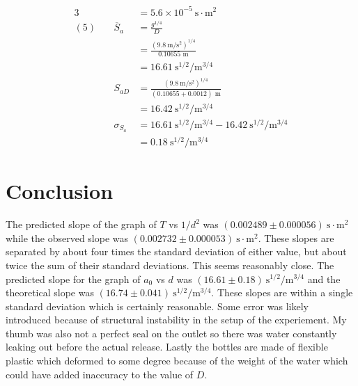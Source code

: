 \documentclass[12pt]{article}
\begin{document}
\begin{alignat*}{3}
            &&&=5.6\times 10^{-5} \mathrm{~s \cdot m^2}\\
            (5)~&&
            \overline{S}_a &= \frac{g^{1/4}}{D}\\
            &&& = \frac{(9.8\mathrm{~m/s^2})^{1/4}}{0.10655\text{ m}}\\
            &&&= 16.61 \mathrm{~s^{1/2}/m^{3/4}}\\
            &&S_{aD} &= \frac{(9.8\mathrm{~m/s^2})^{1/4}}{(0.10655 + 0.0012)\text{ m}}\\
            &&&= 16.42 \mathrm{~s^{1/2}/m^{3/4}}\\
            &&\sigma_{S_a} &= 16.61 \mathrm{~s^{1/2}/m^{3/4}} - 16.42 \mathrm{~s^{1/2}/m^{3/4}}\\
            &&&=0.18\mathrm{~s^{1/2}/m^{3/4}}
        \end{alignat*}
    \section{Conclusion}
    The predicted slope of the graph of \(T\) vs \(1/d^2\) was \((0.002489 \pm 0.000056) \mathrm{~s \cdot m^2}\) while the observed slope was \((0.002732 \pm 0.000053) \mathrm{~s \cdot m^2}\). These slopes are separated by about four times the standard deviation of either value, but about twice the sum of their standard deviations. This seems reasonably close. The predicted slope for the graph of \(a_0\) vs \(d\) was \((16.61 \pm 0.18) \mathrm{~s^{1/2}/m^{3/4}}\) and the theoretical slope was \((16.74 \pm 0.041)\mathrm{~s^{1/2}/m^{3/4}}\). These slopes are within a single standard deviation which is certainly reasonable. Some error was likely introduced because of structural instability in the setup of the experiement. My thumb was also not a perfect seal on the outlet so there was water constantly leaking out before the actual release. Lastly the bottles are made of flexible plastic which deformed to some degree because of the weight of the water which could have added inaccuracy to the value of \(D\).
\end{document}
